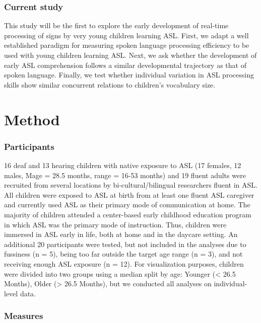 \documentclass[12pt,]{article}
\begin{document}
\subsubsection{Current study}\label{current-study}

This study will be the first to explore the early development of
real-time processing of signs by very young children learning ASL.
First, we adapt a well established paradigm for measuring spoken
language processing efficiency to be used with young children learning
ASL. Next, we ask whether the development of early ASL comprehension
follows a similar developmental trajectory as that of spoken language.
Finally, we test whether individual variation in ASL processing skills
show similar concurrent relations to children's vocabulary size.

\section{Method}\label{method}

\subsubsection{Participants}\label{participants}

16 deaf and 13 hearing children with native exposure to ASL (17 females,
12 males, Mage = 28.5 months, range = 16-53 months) and 19 fluent adults
were recruited from several locations by bi-cultural/bilingual
researchers fluent in ASL. All children were exposed to ASL at birth
from at least one fluent ASL caregiver and currently used ASL as their
primary mode of communication at home. The majority of children attended
a center-based early childhood education program in which ASL was the
primary mode of instruction. Thus, children were immersed in ASL early
in life, both at home and in the daycare setting. An additional 20
participants were tested, but not included in the analyses due to
fussiness (n = 5), being too far outside the target age range (n = 3),
and not receiving enough ASL exposure (n = 12). For visualization
purposes, children were divided into two groups using a median split by
age: Younger (\textless{} 26.5 Months), Older (\textgreater{} 26.5
Months), but we conducted all analyses on individual-level data.

\subsubsection{Measures}\label{measures}
\end{document}
